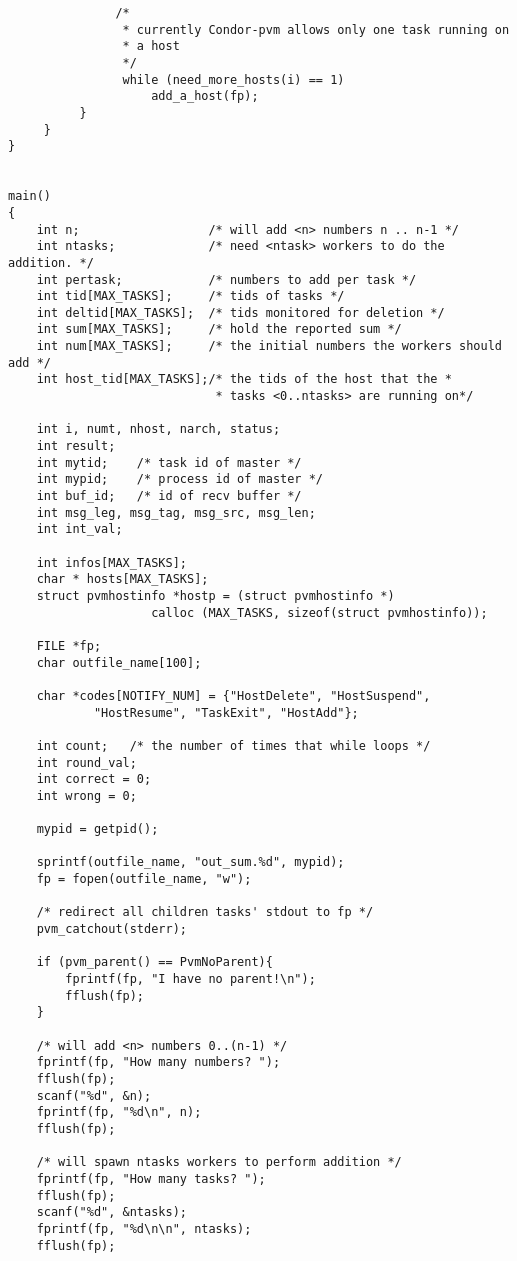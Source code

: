\begin{verbatim}
               /* 
                * currently Condor-pvm allows only one task running on 
                * a host
                */
                while (need_more_hosts(i) == 1)
                    add_a_host(fp);
          }
     }
}


main()
{
    int n;                  /* will add <n> numbers n .. n-1 */
    int ntasks;             /* need <ntask> workers to do the addition. */
    int pertask;            /* numbers to add per task */
    int tid[MAX_TASKS];     /* tids of tasks */ 
    int deltid[MAX_TASKS];  /* tids monitored for deletion */
    int sum[MAX_TASKS];     /* hold the reported sum */
    int num[MAX_TASKS];     /* the initial numbers the workers should add */
    int host_tid[MAX_TASKS];/* the tids of the host that the *
                             * tasks <0..ntasks> are running on*/
    
    int i, numt, nhost, narch, status;
    int result;
    int mytid;    /* task id of master */
    int mypid;    /* process id of master */
    int buf_id;   /* id of recv buffer */
    int msg_leg, msg_tag, msg_src, msg_len;
    int int_val;  

    int infos[MAX_TASKS];
    char * hosts[MAX_TASKS];
    struct pvmhostinfo *hostp = (struct pvmhostinfo *) 
                    calloc (MAX_TASKS, sizeof(struct pvmhostinfo));

    FILE *fp;
    char outfile_name[100];

    char *codes[NOTIFY_NUM] = {"HostDelete", "HostSuspend", 
            "HostResume", "TaskExit", "HostAdd"};
    
    int count;   /* the number of times that while loops */
    int round_val;
    int correct = 0;
    int wrong = 0;

    mypid = getpid();

    sprintf(outfile_name, "out_sum.%d", mypid);
    fp = fopen(outfile_name, "w"); 

    /* redirect all children tasks' stdout to fp */
    pvm_catchout(stderr);  

    if (pvm_parent() == PvmNoParent){
        fprintf(fp, "I have no parent!\n");
        fflush(fp);
    }

    /* will add <n> numbers 0..(n-1) */
    fprintf(fp, "How many numbers? ");
    fflush(fp);
    scanf("%d", &n);
    fprintf(fp, "%d\n", n);
    fflush(fp);

    /* will spawn ntasks workers to perform addition */
    fprintf(fp, "How many tasks? ");
    fflush(fp);
    scanf("%d", &ntasks);
    fprintf(fp, "%d\n\n", ntasks);
    fflush(fp);


\end{verbatim}
